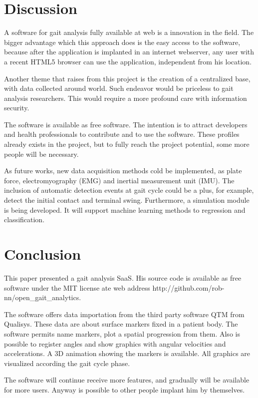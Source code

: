 \documentclass[journal]{IEEEtran}
\begin{document}
\section{Discussion}

A software for gait analysis fully available at web is a innovation in the field.
The bigger advantage which this approach does is the easy access to the software,
because after the application is implanted in an internet webserver, 
any user with a recent HTML5 browser can use the application, independent from
his location.

Another theme that raises from this project is the creation of a centralized 
base, with data collected around world. Such endeavor would be priceless
to gait analysis researchers. This would require a more profound care with 
information security.

The software is available as free software. The intention is to attract
developers and health professionals to contribute and to use the software.
These profiles already exists in the project, but to fully reach the 
project potential, some more people will be necessary.

As future works, new data acquisition methods cold be implemented, as plate force, electromyography (EMG)
and inertial measurement unit (IMU). 
The inclusion of automatic detection events at gait cycle could be a plus, for example,
detect the initial contact and terminal swing.
Furthermore, a simulation module is being developed. 
It will support machine learning methods to regression and classification.


\section{Conclusion}
This paper presented a gait analysis SaaS. His source code is available as free software 
under the MIT license \cite{MIT2015} ate web address http://github.com/rob-nn/open\_gait\_analytics.

The software offers data importation from the third party software QTM from Qualisys.
These data are about surface markers fixed in a patient body.
The software permits name markers, plot a spatial progression from them.
Also is possible to register angles and show graphics with angular velocities and accelerations.
A 3D animation showing the markers is available. 
All graphics are visualized according the gait cycle phase.

The software will continue receive more features, and gradually will be available for more users.
Anyway is possible to other people implant him by themselves.
\end{document}
